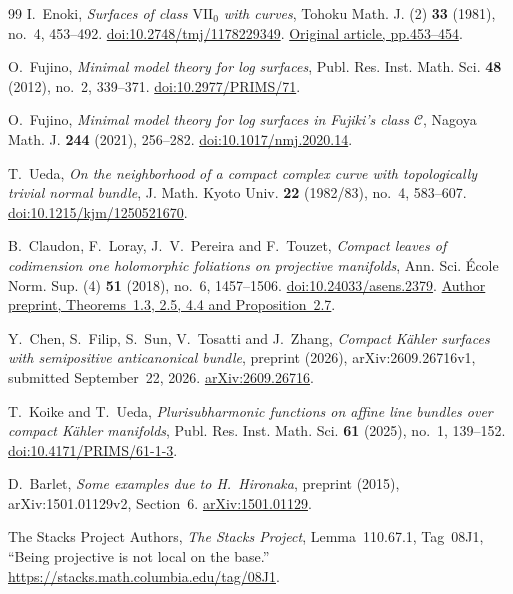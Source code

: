 \documentclass[11pt]{amsart}
\theoremstyle{definition}
\theoremstyle{remark}
\numberwithin{equation}{section}
\begin{document}
\begin{thebibliography}{99}
I.~Enoki, \emph{Surfaces of class $\mathrm{VII}_0$ with curves}, Tohoku Math. J. (2)
\textbf{33} (1981), no.~4, 453--492.
\href{https://doi.org/10.2748/tmj/1178229349}{doi:10.2748/tmj/1178229349}.
\href{https://www.jstage.jst.go.jp/article/tmj1949/33/4/33_4_453/_pdf/-char/en}{Original article, pp.453--454}.

O.~Fujino,
\emph{Minimal model theory for log surfaces},
Publ. Res. Inst. Math. Sci. \textbf{48} (2012), no.~2, 339--371.
\href{https://doi.org/10.2977/PRIMS/71}{doi:10.2977/PRIMS/71}.

O.~Fujino,
\emph{Minimal model theory for log surfaces in Fujiki's class $\mathcal C$},
Nagoya Math. J. \textbf{244} (2021), 256--282.
\href{https://doi.org/10.1017/nmj.2020.14}{doi:10.1017/nmj.2020.14}.

T.~Ueda,
\emph{On the neighborhood of a compact complex curve with topologically
trivial normal bundle},
J. Math. Kyoto Univ. \textbf{22} (1982/83), no.~4, 583--607.
\href{https://doi.org/10.1215/kjm/1250521670}{doi:10.1215/kjm/1250521670}.

B.~Claudon, F.~Loray, J.~V.~Pereira and F.~Touzet,
\emph{Compact leaves of codimension one holomorphic foliations on
projective manifolds},
Ann. Sci. \'Ecole Norm. Sup. (4) \textbf{51} (2018), no.~6, 1457--1506.
\href{https://doi.org/10.24033/asens.2379}{doi:10.24033/asens.2379}.
\href{https://arxiv.org/abs/1512.06623}{Author preprint, Theorems~1.3, 2.5, 4.4 and Proposition~2.7}.

Y.~Chen, S.~Filip, S.~Sun, V.~Tosatti and J.~Zhang,
\emph{Compact K\"ahler surfaces with semipositive anticanonical bundle},
preprint (2026), arXiv:2609.26716v1, submitted September~22, 2026.
\href{https://arxiv.org/abs/2609.26716v1}{arXiv:2609.26716}.

T.~Koike and T.~Ueda,
\emph{Plurisubharmonic functions on affine line bundles over compact
K\"ahler manifolds},
Publ. Res. Inst. Math. Sci. \textbf{61} (2025), no.~1, 139--152.
\href{https://doi.org/10.4171/PRIMS/61-1-3}{doi:10.4171/PRIMS/61-1-3}.

D.~Barlet,
\emph{Some examples due to H.~Hironaka},
preprint (2015), arXiv:1501.01129v2, Section~6.
\href{https://arxiv.org/abs/1501.01129}{arXiv:1501.01129}.

The Stacks Project Authors,
\emph{The Stacks Project},
Lemma~110.67.1, Tag~08J1, ``Being projective is not local on the base.''
\url{https://stacks.math.columbia.edu/tag/08J1}.


\end{thebibliography}
\end{document}
